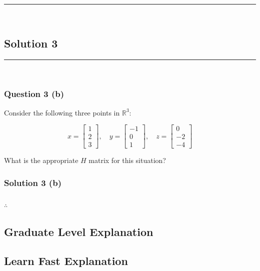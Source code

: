 \documentclass{article}
\begin{document}
\noindent\rule{\textwidth}{0.4pt}\\

\newpage


\subsection*{Solution 3}
\noindent\rule{\textwidth}{0.4pt}\\
\subsubsection*{Question 3 (b)}
\begin{flushleft}
    Consider the following three points in $\mathbb{R}^3$:

\[
x = \begin{bmatrix}1 \\ 2 \\ 3\end{bmatrix}, \quad
y = \begin{bmatrix}-1 \\ 0 \\ 1\end{bmatrix}, \quad
z = \begin{bmatrix}0 \\ -2 \\ -4\end{bmatrix}
\]

\end{flushleft}
\begin{flushleft}

What is the appropriate $H$ matrix for this situation?
  
\end{flushleft}

\subsubsection*{Solution 3 (b)}


\subsubsection*{\normalfont}{$\therefore$ }

\subsection*{Graduate Level Explanation}

\subsection*{Learn Fast Explanation}
\end{document}

